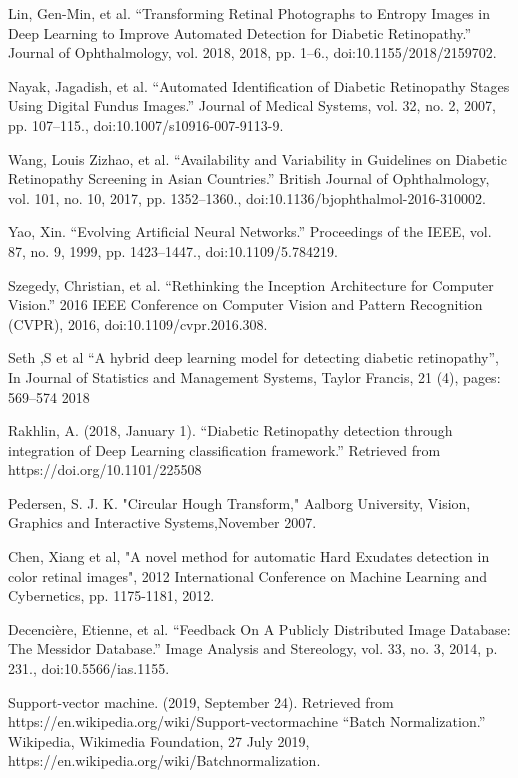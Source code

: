 \begin{thebibliography}{99}
 Lin, Gen-Min, et al. “Transforming Retinal Photographs to Entropy Images in Deep Learning to Improve Automated Detection for Diabetic Retinopathy.” Journal of Ophthalmology, vol. 2018, 2018, pp. 1–6., doi:10.1155/2018/2159702.

 Nayak, Jagadish, et al. “Automated Identification of Diabetic Retinopathy Stages Using Digital Fundus Images.” Journal of Medical Systems, vol. 32, no. 2, 2007, pp. 107–115., doi:10.1007/s10916-007-9113-9.

 Wang, Louis Zizhao, et al. “Availability and Variability in Guidelines on Diabetic Retinopathy Screening in Asian Countries.” British Journal of Ophthalmology, vol. 101, no. 10, 2017, pp. 1352–1360., doi:10.1136/bjophthalmol-2016-310002.

 Yao, Xin. “Evolving Artificial Neural Networks.” Proceedings of the IEEE, vol. 87, no. 9, 1999, pp. 1423–1447., doi:10.1109/5.784219.

 Szegedy, Christian, et al. “Rethinking the Inception Architecture for Computer Vision.” 2016 IEEE Conference on Computer Vision and Pattern Recognition (CVPR), 2016, doi:10.1109/cvpr.2016.308.


 Seth ,S et al “A hybrid deep learning model for detecting diabetic retinopathy”, In Journal of Statistics and Management Systems, Taylor Francis, 21 (4), pages: 569–574 2018

 Rakhlin, A. (2018, January 1). “Diabetic Retinopathy detection through integration of Deep Learning classification framework.” Retrieved from https://doi.org/10.1101/225508

 Pedersen, S. J. K.  "Circular Hough Transform," Aalborg University, Vision, Graphics and Interactive Systems,November 2007. 


 Chen, Xiang et al, "A novel method for automatic Hard Exudates detection in color retinal images", 2012 International Conference on Machine Learning and Cybernetics, pp. 1175-1181, 2012.

 Decencière, Etienne, et al. “Feedback On A Publicly Distributed Image Database: The Messidor Database.” Image Analysis and Stereology, vol. 33, no. 3, 2014, p. 231., doi:10.5566/ias.1155.

 Support-vector machine. (2019, September 24). Retrieved from https://en.wikipedia.org/wiki/Support-vector\textunderscore machine
 “Batch Normalization.” Wikipedia, Wikimedia Foundation, 27 July 2019, https://en.wikipedia.org/wiki/Batch\textunderscore normalization.


\end{thebibliography}
